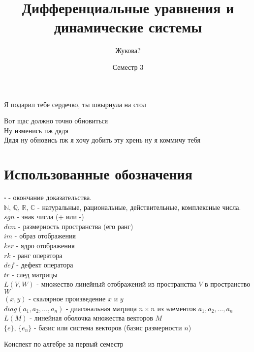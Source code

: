 \documentclass[a4paper]{book}
\title{Дифференциальные уравнения и динамические системы}
\date{Семестр 3}
\author{Жукова?}
\begin{document}
\maketitle
\tableofcontents
\newpage
Я подарил тебе сердечко, ты швырнула на стол

Вот щас должно точно обновиться\\
Ну изменись пж дядя\\
Дядя ну обновись пж я хочу добить эту хрень ну я коммичу тебя\\
\section{Использованные обозначения}
$\square$ - окончание доказательства. \\
$\mathbb N,\,\mathbb Q,\,\mathbb R,\,\mathbb C$ - натуральные, рациональные,
действительные, комплексные числа.\\
$sgn$ - знак числа (+ или -)\\
$dim$ - размерность пространства (его ранг)\\
$im$ - образ отображения\\
$ker$ - ядро отображения\\
$rk$ - ранг оператора\\
$def$ - дефект оператора\\
$tr$ - след матрицы\\
$L(V,W)$ - множество линейный отображений из пространства $V$ в 
пространство $W$\\
$(x,y)$ - скалярное произведение $x$ и $y$\\
$diag(a_1,a_2,...,a_n)$ - диагональная матрица $n\times n$ из элементов
$a_1,a_2,...,a_n$\\
$L(M)$ - линейная оболочка множества векторов $M$\\
$\{e\}$, $\{e_n\}$ - базис или система векторов (базис размерности $n$)\\

\begin{thebibliography}{}
Конспект по алгебре за первый семестр
\end{thebibliography}
\end{document}
